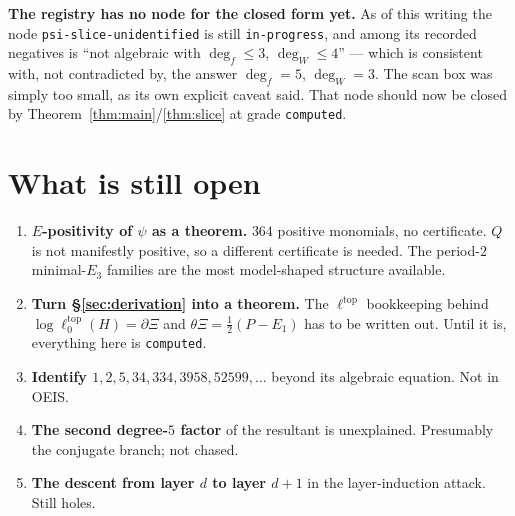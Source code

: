 \documentclass[11pt,a4paper]{article}
\newcommand{\ltop}{\ell^{\mathrm{top}}}
\theoremstyle{plain}
\theoremstyle{definition}
\begin{document}
\sloppy
\noindent\textbf{The registry has no node for the closed form yet.} As of this writing the
node \texttt{psi-slice-unidentified} is still \texttt{in-progress}, and among its recorded
negatives is ``not algebraic with $\deg_f\le3$, $\deg_W\le4$'' --- which is consistent with,
not contradicted by, the answer $\deg_f=5$, $\deg_W=3$. The scan box was simply too small,
as its own explicit caveat said. That node should now be closed by
Theorem~\ref{thm:main}/\ref{thm:slice} at grade \texttt{computed}.

\section*{What is still open}

\begin{enumerate}
\item \textbf{$E$-positivity of $\psi$ as a theorem.} $364$ positive monomials, no
certificate. $Q$ is not manifestly positive, so a different certificate is needed. The
period-$2$ minimal-$E_3$ families are the most model-shaped structure available.
\item \textbf{Turn \S\ref{sec:derivation} into a theorem.} The $\ltop$ bookkeeping behind
$\log\ltop_0(H)=\partial\Xi$ and $\theta\Xi=\tfrac12(P-E_1)$ has to be written out. Until it
is, everything here is \texttt{computed}.
\item \textbf{Identify $1,2,5,34,334,3958,52599,\dots$} beyond its algebraic equation.
Not in OEIS.
\item \textbf{The second degree-$5$ factor} of the resultant is unexplained. Presumably the
conjugate branch; not chased.
\item \textbf{The descent from layer $d$ to layer $d+1$} in the layer-induction attack. Still
holes.
\end{enumerate}
\end{document}
